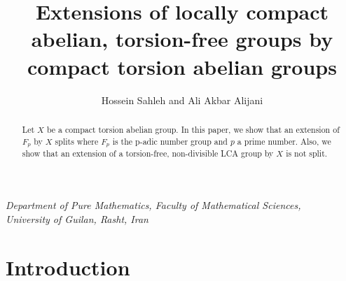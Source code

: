 \documentclass{amsart}
\theoremstyle{definition}
\theoremstyle{remark}
\numberwithin{equation}{section}
\begin{document}
\author[H. Sahleh \lowercase{and} A. A. Alijani]{ H\lowercase{ossein} Sahleh  \lowercase{and} A\lowercase{li} A\lowercase{kbar} Alijani}
\title[E\lowercase{xtensions of locally compact abelian, torsion-free groups by compact torsion abelian groups }] {E\lowercase{xtensions of locally compact abelian, torsion-free groups by compact torsion abelian groups}}

 

\maketitle

\begin{center}
 {\it Department of Pure Mathematics, Faculty of Mathematical Sciences,\\ University of Guilan,
Rasht, Iran}

\end{center}

\begin{abstract}
Let $X$ be a compact torsion abelian group. In this paper, we show that an extension of $F_{p}$ by $X$ splits where $F_{p}$ is the p-adic number group and $p$ a prime number. Also, we show that an extension of a torsion-free, non-divisible LCA group by $X$ is not split.
\end{abstract}

\maketitle
\section*{Introduction}
\end{document}
